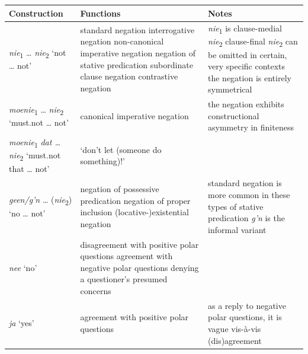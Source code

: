 \documentclass[output=paper,colorlinks,citecolor=brown]{langscibook}
\begin{document}
\begin{table} \footnotesize
\begin{tabularx}{\textwidth}{p{2cm}QQ}
\lsptoprule
{Construction} & {Functions} & {Notes} \\
\midrule
\textit{nie}\textsubscript{1} … \textit{nie}\textsubscript{2} ‘not … not’
&
standard negation
\newline interrogative negation
\newline non-canonical imperative negation
\newline negation of stative predication
\newline subordinate clause negation
\newline contrastive negation
&
\textit{nie}\textsubscript{1} is clause-medial
\newline \textit{nie}\textsubscript{2} clause-final
\newline \textit{nie}\textsubscript{2} can be omitted in certain, very specific contexts
\newline the negation is entirely symmetrical \\
\midrule

\textit{moenie}\textsubscript{1} … \textit{nie}\textsubscript{2} ‘must.not … not’ & canonical imperative negation & the negation exhibits constructional asymmetry in finiteness \\
\midrule

\textit{moenie}\textsubscript{1} \textit{dat … nie}\textsubscript{2} ‘must.not that … not’ & ‘don’t let (someone do something)!’ & \\
\midrule

\textit{geen/g’n} … (\textit{nie}\textsubscript{2}) ‘no … not’
&
negation of possessive predication
\newline negation of proper inclusion
\newline (locative-)existential negation
&
standard negation is more common in these types of stative predication
\newline \textit{g’n} is the informal variant \\
\midrule

\textit{nee} ‘no’
&
disagreement with positive polar questions
\newline agreement with negative polar questions
\newline denying a questioner’s presumed concerns & \\
\midrule

\textit{ja} ‘yes’ & agreement with positive polar questions & as a reply to negative polar questions, it is vague vis-à-vis (dis)agreement \\
\midrule


\end{tabularx}
\end{table}
\end{document}
